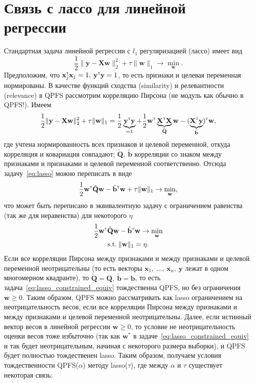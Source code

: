 \documentclass[12pt, a4paper]{article}
\newcommand{\T}{{\text{\tiny\sffamily\upshape\mdseries T}}}
\newcommand{\xmatr}{\mathbf{X}}
\newcommand{\qmatr}{\mathbf{Q}}
\newcommand{\yvec}{\mathbf{y}}
\newcommand{\bvec}{\mathbf{b}}
\newcommand{\xvec}{\mathbf{x}}
\newcommand{\wvec}{\mathbf{w}}
\begin{document}
\section*{Связь с лассо для линейной регрессии}
Стандартная задача линейной регрессии с $l_1$ регуляризацией (лассо) имеет вид
\begin{equation}
\label{eq:lasso}
\frac{1}{2}\|\yvec - \xmatr \wvec\|_2^2 + \tau \|\wvec\|_1 \to \min_{\wvec}.
\end{equation}
Предположим, что $\xvec_j^{\T}\xvec_j = 1,\:\yvec^{\T} \yvec = 1$, то есть признаки и целевая переменная нормированы. В качестве функций сходства (similarity) и релевантности (relevance) в QPFS рассмотрим корреляцию Пирсона (не модуль как обычно в QPFS!). Имеем
$$
\frac{1}{2}\|\yvec - \xmatr \wvec\|_2^2 + \tau \|\wvec\|_1 = \frac{1}{2} \underbrace{\yvec^{\T} \yvec}_{=1} + \frac{1}{2} \wvec^{\T} \underbrace{\xmatr^{\T} \xmatr}_{\tilde{\qmatr}} \wvec - (\underbrace{\xmatr^{\T} \yvec}_{\tilde{\bvec}})^{\T} \wvec,
$$
где учтена нормированность всех признаков и целевой переменной, откуда корреляция и ковариация совпадают; $\tilde{\qmatr},\:\tilde{\bvec}$ корреляции со знаком между признаками и признаками и целевой переменной соответственно. Отсюда задачу~\eqref{eq:lasso} можно переписать в виде
$$
\frac{1}{2} \wvec^{\T} \tilde{\qmatr} \wvec - \tilde{\bvec}^{\T} \wvec + \tau \|\wvec\|_1 \to \min_{\wvec},
$$
что может быть переписано в эквивалентную задачу с ограничением равенства (так же для неравенства) для некоторого $\eta$
\begin{gather}
\label{eq:lasso_constrained_equiv}
\frac{1}{2} \wvec^{\T} \tilde{\qmatr} \wvec - \tilde{\bvec}^{\T} \wvec \to \min_{\wvec}\\
\text{s.t.}\:\|\wvec\|_1 = \eta.
\end{gather}
Если все корреляции Пирсона между признаками и между признаками и целевой переменной неотрицательны (то есть векторы $\xvec_1,\:\ldots,\:\xvec_n,\:\yvec$ лежат в одном многомерном квадранте), то $\tilde{\qmatr} = \qmatr,\:\tilde{\bvec} = \bvec$, то есть задача~\eqref{eq:lasso_constrained_equiv} тождественна QPFS, но без ограничения $\wvec \geq 0$. Таким образом, QPFS можно рассматривать как lasso ограничением на неотрицательность весов, если все корреляции Пирсона между признаками и между признаками и целевой переменной неотрицательны. Далее, если истинный вектор весов в линейной регрессии $\wvec \geq 0$, то условие не неотрицательность оценки весов тоже избыточно (так как $\wvec^*$ в задаче~\eqref{eq:lasso_constrained_equiv} и так будет неотрицательным, начиная с некоторого размера выборки), и QPFS будет полностью тождественен lasso. Таким образом, получаем условия тождественности QPFS($\alpha$) методу lasso($\tau$), где между $\alpha$ и $\tau$ существует некоторая связь:
\end{document}
